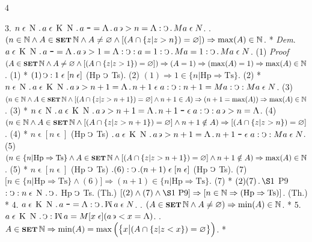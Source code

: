 \documentclass{book}
\newcommand{\s}{\switchcolumn} %
\newcommand{\C}{\mathop{\sbox0{$\displaystyle$$\reflectbox{C}$} %
\raisebox{-\height+\ht0-0.05cm}[\ht0][\dp0]{\scalebox{0.8}[0.8]{\copy0}}}\displaylimits} %
\newcommand{\p}{\mathop{\sbox0{$\displaystyle$$.$}
\raisebox{-\height+\ht0}[\ht0][\dp0]{\scalebox{1}[1]{\copy0}}}\displaylimits} %
\newcommand{\no}{\mathop{\thinspace \scalebox{1.5}{-}}}
\newcommand{\abs}{\mathop{\rotatebox[origin=c]{180}{V}}}
\newcommand{\mini}{\mathop{\rotatebox[origin=c]{180}{M}}}
\newcommand{\larger}{\mathrel{>}}
\newcommand{\smaller}{\mathrel{<}}
\newcommand{\such}{\thinspace \rotatebox[origin=c]{180}{$\epsilon$}}
\newcommand{\smallIn}{\ensuremath{\mathrel{\epsilon}}}
\newcommand{\K}{\mathop{\thinspace \text{K} \thinspace}}
\newcommand{\N}{\mathop{\thinspace \text{N} \thinspace}}
\newcommand{\setOfSets}{\mathop{\text{{\footnotesize \textbf{SET}}}}}
\renewcommand{\rightarrow}{\Rightarrow}
\newenvironment{translateFourCol}[4]
               { %
                 \setcolumnwidth{#1\fill/1em, #2\fill/\columnsep, #3\fill/1em, #4\fill}
                 \begin{paracol}{4}
                 \newcommand{\LAT}{\switchcolumn[0]*}
                 \newcommand{\ENG}{\switchcolumn[2]}
               }
               { %
                 \let\ENG\undefined
                 \let\LAT\undefined
                 \end{paracol}
               }
\begin{document}
\begin{translateFourCol}{0.08}{0.42}{0.08}{0.42}
\raggedright
3. \s $n \smallIn \N \p a \smallIn \K \N \p a \no = \abs \p a \such \larger n = \abs : \C \p M a \smallIn N$.
\ENG
3. \s $(n \in \mathbb{N} \wedge A \in \setOfSets \mathbb{N} \wedge A \neq \varnothing \wedge [(A \cap \{ z | z > n \}) = \varnothing]) \rightarrow \max(A) \in \mathbb{N}$.
\LAT
\emph{Dem}. \s $a \smallIn \K \N \p a \no = \abs \p a \such \larger 1 = \abs : \C : a = 1 : \C \p M a = 1 : \C \p M a \smallIn N$. \hfill (1)
\ENG
\emph{Proof} \s $(A \in \setOfSets \mathbb{N} \wedge A \neq \varnothing \wedge [(A \cap \{ z | z > 1 \}) = \varnothing]) \rightarrow (A = 1) \rightarrow (\max(A) = 1) \rightarrow \max(A) \in \mathbb{N}$. \hfill (1)
\LAT
\s $(1) \C : 1 \smallIn [n \smallIn]$ (Hp $\C$ Ts). \hfill (2)
\ENG
\s $(1) \rightarrow 1 \in \{ n | \text{Hp} \rightarrow \text{Ts} \}$. \hfill (2)
\LAT
\s $n \smallIn \N \p a \smallIn \K \N \p a \such \larger n + 1 = \abs \p n + 1 \smallIn a : \C : n + 1 = M a : \C : M a \smallIn N$. \hfill (3)
\ENG
\s $(n \in \mathbb{N} \wedge A \in \setOfSets \mathbb{N} \wedge [(A \cap \{ z | z > n + 1 \}) = \varnothing] \wedge n + 1 \in A) \rightarrow (n + 1 = \max(A)) \rightarrow \max(A) \in \mathbb{N}$. \hfill (3)
\LAT
\s $n \smallIn \N \p a \smallIn \K \N \p a \such \larger n + 1 = \abs \p n + 1 \no \smallIn a : \C : a \such \larger n = \abs$. \hfill (4)
\ENG
\s $(n \in \mathbb{N} \wedge A \in \setOfSets \mathbb{N} \wedge [(A \cap \{ z | z > n + 1 \}) = \varnothing] \wedge n + 1 \notin A) \rightarrow [(A \cap \{ z | z > n \}) = \varnothing]$. \hfill (4)
\LAT
\s $n \smallIn [n \smallIn]$ (Hp $\C$ Ts) $\p a \smallIn \K \N \p a \such > n + 1 = \abs \p n + 1 \no \smallIn a : \C : M a \smallIn N$. \hfill (5)
\ENG
\s $(n \in \{ n | \text{Hp} \rightarrow \text{Ts} \} \wedge A \in \setOfSets \mathbb{N} \wedge [(A \cap \{ z | z > n + 1 \}) = \varnothing] \wedge n + 1 \notin A) \rightarrow \max(A) \in \mathbb{N}$. \hfill (5)
\LAT
\s $n \smallIn [n \smallIn]$ (Hp $\C$ Ts) $. (6) : \C \p (n+ 1) \smallIn [n \smallIn]$ (Hp $\C$ Ts). \hfill (7)
\ENG
\s $[n \in \{ n | \text{Hp} \rightarrow \text{Ts} \} \wedge (6)] \rightarrow (n + 1) \in \{ n | \text{Hp} \rightarrow \text{Ts} \}$. \hfill (7)
\LAT
\s $(2)(7) \p \S1$ P9 $: \C : n \smallIn \N \p \C \p$ Hp $\C$ Ts. \hfill (Th.)
\ENG
\s $[(2) \wedge (7) \wedge \S1\ \text{P9}] \rightarrow [n \in \mathbb{N} \rightarrow (\text{Hp} \rightarrow \text{Ts})]$. \hfill (Th.)
\LAT
4. \s $a \smallIn \K \N \p a \no = \abs : \C \p \mini a \smallIn N$.
\ENG
4. \s $(A \in \setOfSets \mathbb{N} \wedge A \neq \varnothing) \rightarrow \min(A) \in \mathbb{N}$.
\LAT
5. \s $a \smallIn \K \N \p \C : \mini a = M [x \smallIn] (a \such \smaller x = \abs)$.
\ENG
5. \s $A \in \setOfSets \mathbb{N} \rightarrow \min(A) = \max\Big( \big\{ x \big| (A \cap \{ z | z < x \}) = \varnothing \big\} \Big)$.
\LAT
\end{translateFourCol}
\end{document}
